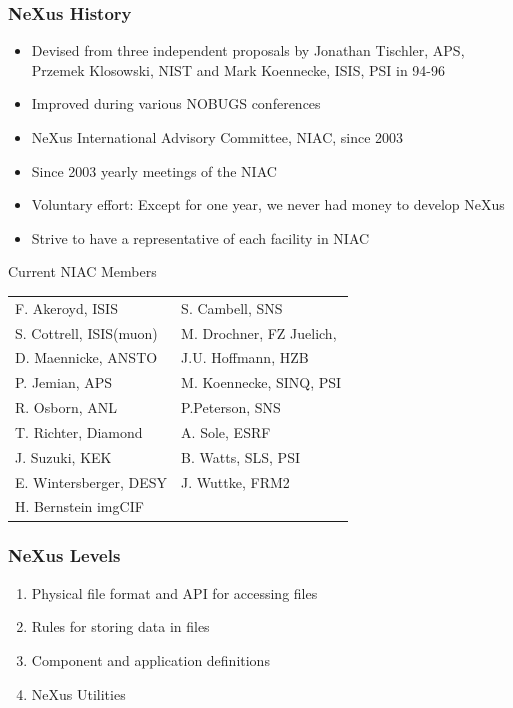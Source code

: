 \documentclass{beamer}
\begin{document}
\begin{frame} \frametitle{NeXus History }
\begin{itemize}
\item Devised from three independent proposals by Jonathan Tischler, 
  APS, Przemek Klosowski, NIST and 
 Mark Koennecke, ISIS, PSI in 94-96
\item Improved during various NOBUGS conferences
\item NeXus International Advisory Committee, NIAC, since 2003
\item Since 2003 yearly meetings of the NIAC
\item Voluntary effort: Except for one year, we never had money to develop NeXus
\item Strive to have a representative of each facility in NIAC
\end{itemize}
\end{frame}

\begin{frame}{Current NIAC Members}
\begin{tabular}{ll}
F. Akeroyd, ISIS  & S. Cambell, SNS \\
S. Cottrell, ISIS(muon)  & M. Drochner, FZ Juelich, \\
D. Maennicke, ANSTO & J.U. Hoffmann, HZB\\ 
P. Jemian, APS & M. Koennecke, SINQ, PSI\\
R. Osborn, ANL & P.Peterson, SNS \\
T. Richter, Diamond & A. Sole, ESRF\\
J. Suzuki, KEK & B. Watts, SLS, PSI\\
 E. Wintersberger, DESY & J. Wuttke, FRM2\\
H. Bernstein imgCIF& \\
\end{tabular}
\end{frame}

\begin{frame}
 \frametitle{NeXus Levels }
\begin{enumerate}
\item Physical file format and API for accessing files
\item Rules for storing data in files
\item Component and application definitions
\item NeXus Utilities
\end{enumerate}
\end{frame}
\end{document}
